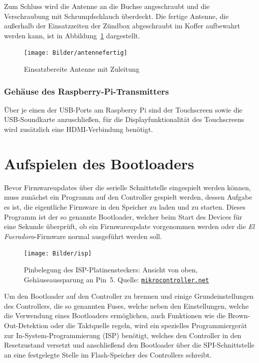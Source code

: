 \documentclass[paper=a4, parskip, numbers=noenddot, toc=listof, headsepline]{scrbook}
\newcommand{\anlage}{\emph{El Fueradoro}}
\begin{document}
					Zum Schluss wird die Antenne an die Buchse angeschraubt und die Verschraubung mit Schrumpfschlauch überdeckt. Die fertige Antenne, die außerhalb der Einsatzzeiten der Zündbox abgeschraubt im Koffer aufbewahrt werden kann, ist in Abbildung~\ref{fig:antennefertig} dargestellt.

					\begin{figure}
						\centering
						\texttt{[image: Bilder/antennefertig]}
						\caption{Einsatzbereite Antenne mit Zuleitung}
						\label{fig:antennefertig}
					\end{figure}

			\subsection{Gehäuse des Raspberry-Pi-Transmitters}
				\label{subsec:raspicase}

				Über je einen der USB-Ports am Raspberry Pi sind der Touchscreen sowie die USB-Soundkarte anzuschließen, für die Displayfunktionalität des Touchscreens wird zusätzlich eine HDMI-Verbindung benötigt.

	\chapter{Aufspielen des Bootloaders}
		\label{ch:bootloader}

		Bevor Firmwareupdates über die serielle Schnittstelle eingespielt werden können, muss zunächst ein Programm auf den Controller gespielt werden, dessen Aufgabe es ist, die eigentliche Firmware in den Speicher zu laden und zu starten. Dieses Programm ist der so genannte Bootloader, welcher beim Start des Devices für eine Sekunde überprüft, ob ein Firmwareupdate vorgenommen werden oder die {\anlage}-Firmware normal ausgeführt werden soll.

		\begin{figure}[!h]
			\centering
			\texttt{[image: Bilder/isp]}
			\caption{Pinbelegung des ISP-Platinensteckers: Ansicht von oben, Gehäuseaussparung an Pin~5. Quelle: \href{http://www.mikrocontroller.net}{\texttt{mikrocontroller.net}}}
			\label{fig:isp}
		\end{figure}

		Um den Bootloader auf den Controller zu brennen und einige Grundeinstellungen des Controllers, die so genannten Fuses, welche neben den Einstellungen, welche die Verwendung eines Bootloaders ermöglichen, auch Funktionen wie die Brown-Out-Detektion oder die Taktquelle regeln, wird ein spezielles Programmiergerät zur In-System-Programmierung (ISP) benötigt, welches den Controller in den Resetzustand versetzt und anschließend den Bootloader über die SPI-Schnittstelle an eine festgelegte Stelle im Flash-Speicher des Controllers schreibt.
\end{document}
